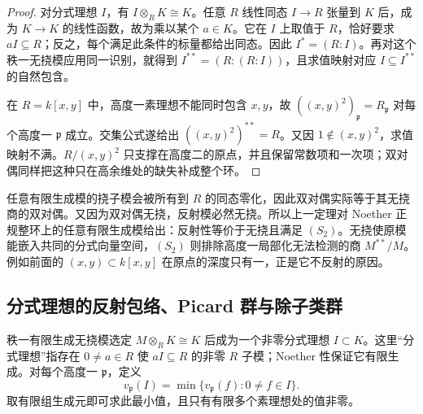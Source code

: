 \begin{proof}
	对分式理想 \(I\)，有 \(I\otimes_RK\cong K\)。任意 \(R\) 线性同态 \(I\to R\) 张量到 \(K\) 后，成为 \(K\to K\) 的线性函数，故为乘以某个 \(a\in K\)。它在 \(I\) 上取值于 \(R\)，恰好要求 \(aI\subseteq R\)；反之，每个满足此条件的标量都给出同态。因此 \(I^*=(R:I)\)。再对这个秩一无挠模应用同一识别，就得到 \(I^{**}=(R:(R:I))\)，且求值映射对应 \(I\subseteq I^{**}\) 的自然包含。

	在 \(R=k[x,y]\) 中，高度一素理想不能同时包含 \(x,y\)，故 \(((x,y)^2)_{\mathfrak p}=R_{\mathfrak p}\) 对每个高度一 \(\mathfrak p\) 成立。交集公式遂给出 \(((x,y)^2)^{**}=R\)。又因 \(1\notin(x,y)^2\)，求值映射不满。\(R/(x,y)^2\) 只支撑在高度二的原点，并且保留常数项和一次项；双对偶同样把这种只在高余维处的缺失补成整个环。
\end{proof}

任意有限生成模的挠子模会被所有到 \(R\) 的同态零化，因此双对偶实际等于其无挠商的双对偶。又因为双对偶无挠，反射模必然无挠。所以上一定理对 Noether 正规整环上的任意有限生成模给出：反射性等价于无挠且满足 \((S_2)\)。无挠使原模能嵌入共同的分式向量空间，\((S_2)\) 则排除高度一局部化无法检测的商 \(M^{**}/M\)。例如前面的 \((x,y)\subset k[x,y]\) 在原点的深度只有一，正是它不反射的原因。

\subsection{分式理想的反射包络、Picard 群与除子类群}
\label{b3:subsec:2005:02}

秩一有限生成无挠模选定 \(M\otimes_RK\cong K\) 后成为一个非零分式理想 \(I\subset K\)。这里“分式理想”指存在 \(0\ne a\in R\) 使 \(aI\subseteq R\) 的非零 \(R\) 子模；Noether 性保证它有限生成。对每个高度一 \(\mathfrak p\)，定义
\[
	v_{\mathfrak p}(I)=\min\{v_{\mathfrak p}(f):0\ne f\in I\}.
\]
取有限组生成元即可求此最小值，且只有有限多个素理想处的值非零。


